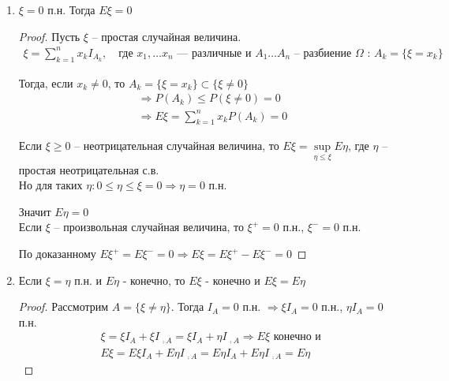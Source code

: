 \begin{enumerate}[resume*=mean_properties]

  \item
    $\xi = 0$ п.н. Тогда $E \xi = 0$

    \begin{proof}
      Пусть $\xi$ -- простая случайная величина.
      \begin{align*}
        \xi = \sum_{k = 1}^{n} x_k I_{A_k}, \quad 
        \text{где $x_1, \ldots x_n$ --- различные и $A_1 \ldots A_n$ --
        разбиение $\Omega$ : $A_k = \{ \xi = x_k \}$}
      \end{align*}

      Тогда, если $x_k \neq 0$, то $A_k = \{ \xi = x_k \} \subset \{ \xi \neq 0 \}$
      \begin{align*}
        &\Rightarrow P(A_k) \leq P(\xi \neq 0) = 0\\
        &\Rightarrow E \xi = \sum_{k = 1}^{n} x_k P(A_k) = 0
      \end{align*}

      Если $\xi \geq 0$ -- неотрицательная случайная величина, то 
      $E \xi = \sup\limits_{\eta \leq \xi} E \eta$, где $\eta$ -- простая неотрицательная с.в.\\
      Но для таких $\eta: 0 \leq \eta \leq \xi = 0 \Rightarrow \eta = 0$ п.н.

      Значит $E \eta = 0$\\

      Если $\xi$ -- произвольная случайная величина, то $\xi^+ = 0$ п.н., $\xi^- = 0$ п.н.

      По доказанному $E \xi^+ = E \xi^- = 0 \Rightarrow E \xi = E \xi^+ - E \xi^- = 0$
    \end{proof}

  \item
    Если $\xi = \eta$ п.н. и $E \eta$ - конечно, то $E \xi$ - конечно и $E \xi = E \eta$

    \begin{proof}
      Рассмотрим $A = \{\xi \neq \eta\}$. Тогда $I_A = 0$ п.н. $\Rightarrow \xi I_A = 0$ п.н.,
      $\eta I_A = 0$ п.н.
      \begin{align*}
        &\xi = \xi I_A + \xi I_{\,\comp{A}} = \xi I_A + \eta I_{\,\comp{A}} 
        \Rightarrow E \xi \text{ конечно и }\\
        &E \xi = E \xi I_A + E \eta I_{\,\comp{A}} = E \eta I_A + E \eta I_{\,\comp{A}} = E \eta
      \end{align*}
    \end{proof}


\end{enumerate}
